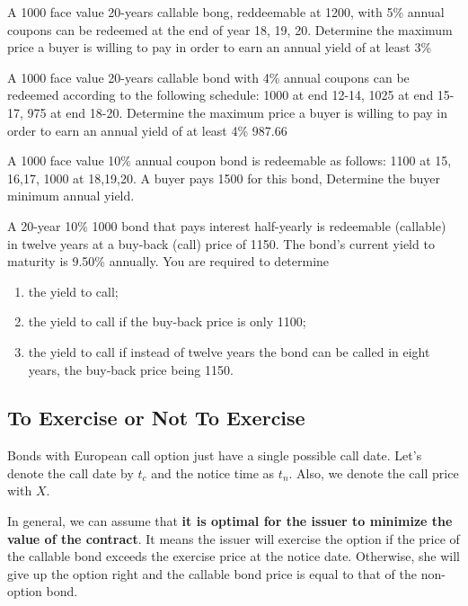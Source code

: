 \documentclass[12pt,a4paper]{article}
\begin{document}
\begin{question} A 1000 face value 20-years callable bong, reddeemable at 1200, with 5\% annual coupons can be redeemed at the end of year 18, 19, 20. Determine the maximum price a buyer is willing to pay in order to earn an annual yield of at least 3\%
\end{question}

\begin{question} A 1000 face value 20-years callable bond with 4\% annual coupons can be redeemed according to the following schedule:
1000 at end 12-14, 1025 at end 15-17, 975 at end 18-20.
Determine the maximum price a buyer is willing to pay in order to earn an annual yield of at least 4\%
987.66
\end{question}

\begin{question} A 1000 face value 10\% annual coupon bond is redeemable as follows: 1100 at 15, 16,17, 1000 at 18,19,20. A buyer pays 1500 for this bond, Determine the buyer minimum annual yield.
\end{question}

\begin{question} A 20-year 10\% 1000 bond that pays interest half-yearly is redeemable (callable) in twelve years at a buy-back (call) price of 1150. The bond's current yield to maturity is 9.50\% annually. You are required to determine 
\begin{enumerate}[label=(\alph*),font=\itshape]
	\item the yield to call;
	\item the yield to call if the buy-back price is only 1100;
	\item the yield to call if instead of twelve years the bond can be called in eight years, the buy-back price being 1150.
\end{enumerate}
\end{question}

\subsection{To Exercise or Not To Exercise}

Bonds with European call option just have a single possible call date. Let's denote the call date by $t_c$ and the notice time as $t_n$. Also, we denote the call price with $X$. 

In general, we can assume that \textbf{it is optimal for the issuer to minimize the value of the contract}. It means the issuer will exercise the option if the price of the callable bond exceeds the exercise price at the notice date. Otherwise, she will give up the option right and the callable bond price is equal to that of the non-option bond.
\end{document}

